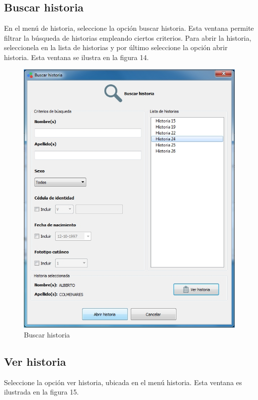 	\subsection{Buscar historia}
	
	En el men\'{u} de historia, seleccione la opci\'{o}n buscar historia. Esta ventana permite filtrar la b\'{u}squeda de historias empleando ciertos criterios. Para abrir la historia, seleccionela en la lista de historias y por \'{u}ltimo seleccione la opci\'{o}n abrir historia. Esta ventana se ilustra en la figura 14.
	
\begin{figure}[H]
  \centering
  \includegraphics[width=.9\linewidth]{./img/buscar-historia.jpg}
\caption{Buscar historia}
\end{figure}
	
	\subsection{Ver historia}
	
	Seleccione la opci\'{o}n ver historia, ubicada en el men\'{u} historia. Esta ventana es ilustrada en la figura 15.
	
